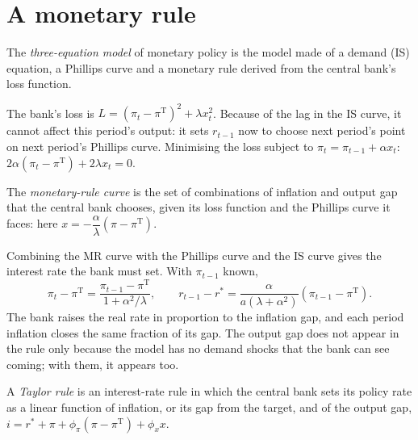 \section{A monetary rule}\label{sec:b2:three-equation-model:mr}

\begin{definition}\label{def:b2:three-equation-model:three-equation}
The \emph{three-equation model} of monetary policy is the model made of a demand (IS)
equation, a Phillips curve and a monetary rule derived from the central bank's loss function.
\end{definition}

The bank's loss is $L = (\pi_t - \pi^{\mathrm T})^2 + \lambda x_t^2$. Because of the lag in the IS curve, it cannot affect this period's output: it sets $r_{t-1}$ now to choose next period's point on next
period's Phillips curve. Minimising the loss subject to $\pi_t = \pi_{t-1} + \alpha x_t$: $2\alpha(\pi_t - \pi^{\mathrm T}) + 2\lambda x_t = 0$.

\begin{definition}\label{def:b2:three-equation-model:mr}
The \emph{monetary-rule curve} is the set of combinations of inflation and output gap that the
central bank chooses, given its loss function and the Phillips curve it faces: here $x = -\dfrac{\alpha}{\lambda}(\pi - \pi^{\mathrm T})$.
\end{definition}

Combining the MR curve with the Phillips curve and the IS curve gives the interest rate the bank must set. With $\pi_{t-1}$ known,
\begin{equation}\label{eq:b2:three-equation-model:rule}
\pi_t - \pi^{\mathrm T} = \frac{\pi_{t-1} - \pi^{\mathrm T}}{1 + \alpha^2/\lambda}, \qquad r_{t-1} - r^* = \frac{\alpha}{a(\lambda + \alpha^2)}(\pi_{t-1} - \pi^{\mathrm T}).
\end{equation}
The bank raises the real rate in proportion to the inflation gap, and each period inflation closes the same fraction of its
gap. The output gap does not appear in the rule only because the model has no demand shocks that the bank can see
coming; with them, it appears too.

\begin{definition}\label{def:b2:three-equation-model:taylor-rule}
A \emph{Taylor rule} is an interest-rate rule in which the central bank sets its policy rate as a linear
function of inflation, or its gap from the target, and of the output gap, $i = r^* + \pi + \phi_\pi(\pi - \pi^{\mathrm T}) + \phi_x x$.
\end{definition}

